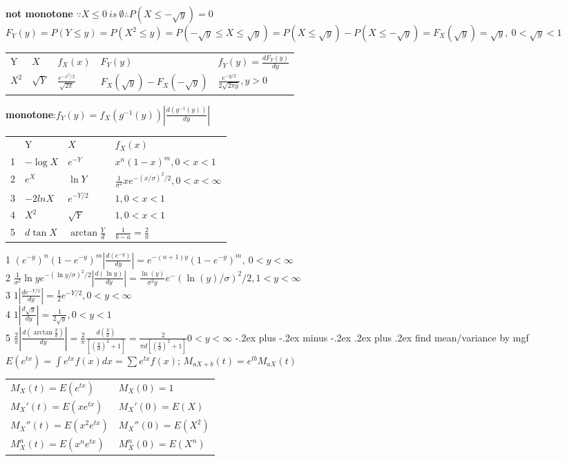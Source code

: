 \documentclass[10pt,landscape]{article}
\makeatletter
\renewcommand{\subsubsection}{\@startsection{subsubsection}{3}{0mm}%
                                {-.2ex plus -.2ex minus -.2ex}%
                                {.2ex plus .2ex}%
                                {\normalfont\small\bfseries}}
\makeatother
\begin{document}
\begin{multicols}{3}
	\textbf{not monotone}
$\because X\le 0\ is\ \emptyset \therefore P(X\le-\sqrt y)=0$\\
$F_Y(y)=P(Y\le y)=P(X^2\le y)=P(-\sqrt y\le X\le\sqrt y)=P(X\le\sqrt y)-P(X\le-\sqrt y)=F_X(\sqrt y)=\sqrt y,\ 0<\sqrt y<1$
\begin{tabular}{ l|l|l|l|l }
Y     & $X$       & $f_X(x)$ & $F_Y(y)$ & $f_Y(y)=\frac{dF_Y(y)}{dy}$ \\
$X^2$ & $\sqrt Y$ & $\frac{e^{-x^2/2}}{\sqrt{2\pi}}$ & $F_X(\sqrt y)-F_X(-\sqrt y)$ & $\frac{e^{-y/2}}{2\sqrt{2\pi y}},y>0$ 
\end{tabular}

	\textbf{monotone}:$f_Y(y)=f_X(g^{-1}(y))|\frac{d(g^{-1}(y))}{dy}|$
\begin{tabular}{ l|l|l|l }
  & Y         & $X$               & $f_X(x)$ \\
1 & $-\log X$ & $e^{-Y}$          & $x^n(1-x)^m,0<x<1$ \\
2 & $e^X$     & $\ln Y$           & $\frac1{\sigma^2}xe^{-(x/\sigma)^2/2}, 0<x<\infty$ \\
3 & $-2lnX$   & $e^{-Y/2}$        & $1, 0<x<1$ \\
4 & $X^2$     & $\sqrt Y$         & $1, 0<x<1$ \\
5 & $d\tan X$ & $\arctan\frac Yd$ & $\frac1{b-a}=\frac2\pi$ 
\end{tabular}

1 $(e^{-y})^n(1-e^{-y})^m|\frac{d(e^{-y})}{dy}|=e^{-(n+1)y}(1-e^{-y})^m,\ 0<y<\infty$ \\
2 $\frac{1}{\sigma^2}{\ln y}e^{-({\ln y}/\sigma)^2/2}|\frac{d(\ln y)}{dy}|=\frac{\ln(y)}{\sigma^2y}e^-(\ln(y)/\sigma)^2/2, 1<y<\infty$ \\
3 $1|\frac{de^{-Y/2}}{dy}|=\frac{1}{2}e^{-Y/2},0<y<\infty$ \\
4 $1|\frac{d\sqrt y}{dy}|=\frac{1}{2\sqrt y},0<y<1$ \\
5 $\frac2\pi|\frac{d(\arctan\frac yd)}{dy}|=\frac2\pi\frac{d(\frac yd)}{[(\frac yd)^2+1]}=\frac{2}{\pi d[(\frac yd)^2+1]} 0<y<\infty$
\subsubsection{find mean/variance by mgf}
$E(e^{tx})=\int e^{tx}f(x)dx=\sum e^{tx}f(x)$; $M_{aX+b}(t)=e^{tb}M_{aX}(t)$

\begin{tabular}{ l|l }
$M_X(t)=E(e^{tx})$   & $M_X(0)=1$ \\
$M_X'(t)=E(xe^{tx})$  & $M_X'(0)=E(X)$  \\ 
$M_X''(t)=E(x^2e^{tx})$ & $M_X''(0)=E(X^2)$ \\
$M_X^n(t)=E(x^ne^{tx})$ & $M_X^n(0)=E(X^n)$
\end{tabular}


\end{multicols}
\end{document}
